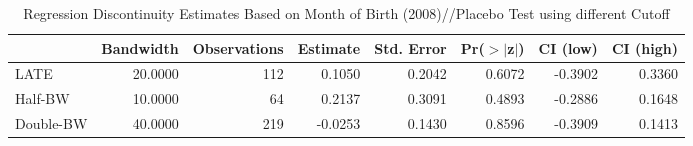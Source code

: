 \begin{table}[ht]
\centering
\begin{tabular}{lrrrrrrr}
  \hline
 & Bandwidth & Observations & Estimate & Std. Error & Pr($>$$|$z$|$) & CI (low) & CI (high) \\ 
  \hline
LATE & 20.0000 & 112 & 0.1050 & 0.2042 & 0.6072 & -0.3902 & 0.3360 \\ 
  Half-BW & 10.0000 & 64 & 0.2137 & 0.3091 & 0.4893 & -0.2886 & 0.1648 \\ 
  Double-BW & 40.0000 & 219 & -0.0253 & 0.1430 & 0.8596 & -0.3909 & 0.1413 \\ 
   \hline
\end{tabular}
\caption{Regression Discontinuity Estimates Based on Month of Birth (2008)//Placebo Test using different Cutoff} 
\label{tab:rd2008m_plac}
\end{table}
